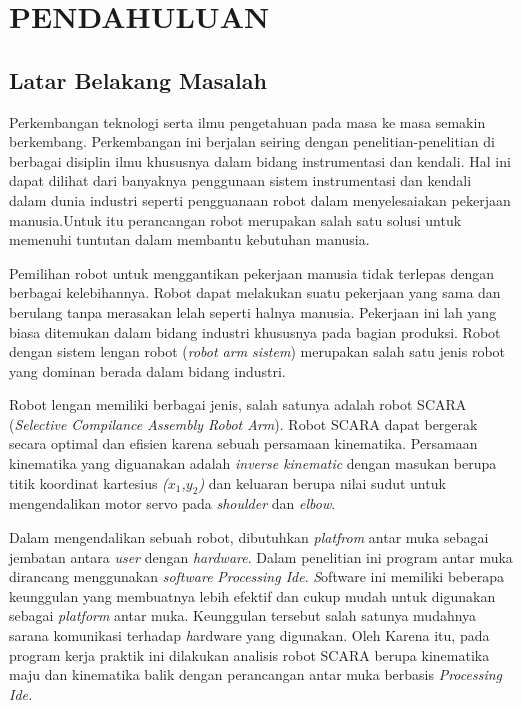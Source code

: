 
\chapter{PENDAHULUAN}

\section{Latar Belakang Masalah}

	Perkembangan teknologi serta ilmu pengetahuan pada masa ke masa semakin berkembang. Perkembangan ini berjalan seiring dengan penelitian-penelitian di berbagai disiplin ilmu khususnya dalam bidang instrumentasi dan kendali. Hal ini dapat dilihat dari banyaknya penggunaan sistem instrumentasi dan kendali dalam dunia industri seperti pengguanaan robot dalam menyelesaiakan pekerjaan manusia.Untuk itu perancangan robot merupakan salah satu solusi untuk memenuhi tuntutan dalam membantu kebutuhan manusia.
	
	Pemilihan robot untuk menggantikan pekerjaan manusia tidak terlepas dengan berbagai kelebihannya. Robot dapat melakukan suatu pekerjaan yang sama dan berulang tanpa merasakan lelah seperti halnya manusia. Pekerjaan ini lah yang biasa ditemukan dalam bidang industri khususnya pada bagian produksi. Robot dengan sistem lengan robot (\emph {robot arm sistem}) merupakan salah satu jenis robot yang dominan berada dalam bidang industri. 
	
	Robot lengan memiliki berbagai jenis, salah satunya adalah robot SCARA (\emph{Selective Compilance Assembly Robot Arm}). Robot SCARA dapat bergerak secara optimal dan efisien karena sebuah persamaan kinematika. Persamaan kinematika yang diguanakan adalah \textit{inverse kinematic} dengan masukan berupa titik koordinat kartesius \textit{($x_{1}$,$y_{2}$)} dan keluaran berupa nilai sudut untuk mengendalikan motor servo pada \textit{shoulder} dan \textit{elbow}.
	
	Dalam mengendalikan sebuah robot, dibutuhkan \textit{platfrom} antar muka sebagai jembatan antara \textit{user} dengan \textit{hardware}. Dalam penelitian ini program antar muka dirancang menggunakan \textit{software} \emph{Processing Ide}. \emph Software ini memiliki beberapa keunggulan yang membuatnya lebih efektif dan cukup mudah untuk digunakan sebagai \textit{platform} antar muka. Keunggulan tersebut salah satunya mudahnya sarana komunikasi terhadap \emph hardware yang digunakan. Oleh Karena itu, pada program kerja praktik ini dilakukan analisis robot SCARA berupa kinematika maju dan kinematika balik dengan perancangan antar muka berbasis \emph {Processing Ide.}\\


